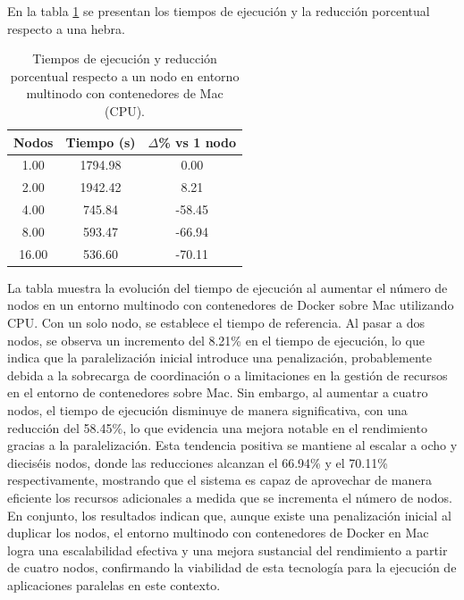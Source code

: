 En la tabla \ref{tab:multi-node_mac_docker} se presentan los tiempos de ejecución y la reducción porcentual respecto a una hebra.

\begin{table}[ht]
    \centering
    \begin{tabular}{|c|c|c|}
        \hline
        \textbf{Nodos} & \textbf{Tiempo (s)} & \textbf{$\Delta$\% vs 1 nodo} \\
        \hline
        1.00           & 1794.98             & 0.00                          \\
        2.00           & 1942.42             & 8.21                          \\
        4.00           & 745.84              & -58.45                        \\
        8.00           & 593.47              & -66.94                        \\
        16.00          & 536.60              & -70.11                        \\
        \hline
    \end{tabular}
    \caption{Tiempos de ejecución y reducción porcentual respecto a un nodo en entorno multinodo con contenedores de Mac (CPU).}
    \label{tab:multi-node_mac_docker}
\end{table}

La tabla muestra la evolución del tiempo de ejecución al aumentar el número de nodos en un entorno multinodo con contenedores de Docker sobre Mac utilizando CPU. Con un solo nodo, se establece el tiempo de referencia. Al pasar a dos nodos, se observa un incremento del 8.21\% en el tiempo de ejecución, lo que indica que la paralelización inicial introduce una penalización, probablemente debida a la sobrecarga de coordinación o a limitaciones en la gestión de recursos en el entorno de contenedores sobre Mac. Sin embargo, al aumentar a cuatro nodos, el tiempo de ejecución disminuye de manera significativa, con una reducción del 58.45\%, lo que evidencia una mejora notable en el rendimiento gracias a la paralelización. Esta tendencia positiva se mantiene al escalar a ocho y dieciséis nodos, donde las reducciones alcanzan el 66.94\% y el 70.11\% respectivamente, mostrando que el sistema es capaz de aprovechar de manera eficiente los recursos adicionales a medida que se incrementa el número de nodos. En conjunto, los resultados indican que, aunque existe una penalización inicial al duplicar los nodos, el entorno multinodo con contenedores de Docker en Mac logra una escalabilidad efectiva y una mejora sustancial del rendimiento a partir de cuatro nodos, confirmando la viabilidad de esta tecnología para la ejecución de aplicaciones paralelas en este contexto.

